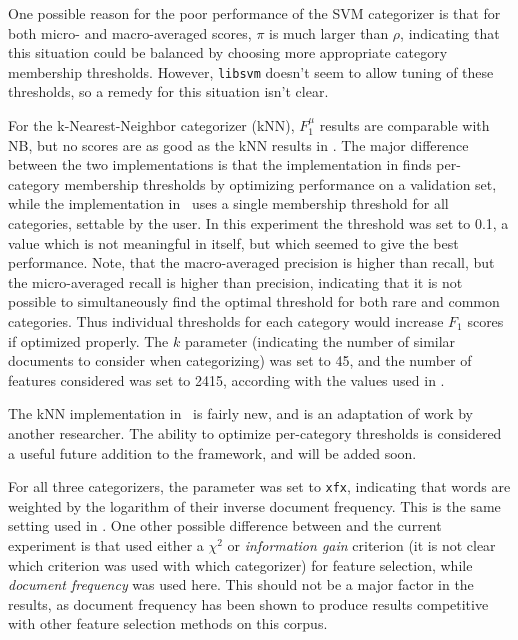 One possible reason for the poor performance of the SVM categorizer is
that for both micro- and macro-averaged scores, $\pi$ is much larger
than $\rho$, indicating that this situation could be balanced by
choosing more appropriate category membership thresholds.  However,
\texttt{libsvm} doesn't seem to allow tuning of these thresholds, so a
remedy for this situation isn't clear.

For the k-Nearest-Neighbor categorizer (kNN), $F_1^\mu$ results are comparable
with NB, but no scores are as good as the kNN results in \cite{yang:99}.
The major difference between the two implementations is that the
implementation in \cite{yang:99} finds per-category membership
thresholds by optimizing performance on a validation set, while the
implementation in \aicat\ uses a single membership threshold for all
categories, settable by the user.  In this experiment the threshold
was set to 0.1, a value which is not meaningful in itself, but which
seemed to give the best performance.  Note, that the macro-averaged
precision is higher than recall, but the micro-averaged recall is
higher than precision, indicating that it is not possible to
simultaneously find the optimal threshold for both rare and common
categories.  Thus individual thresholds for each category would
increase $F_1$ scores if optimized properly.  The $k$ parameter
(indicating the number of similar documents to consider when
categorizing) was set to 45, and the number of features considered was
set to 2415, according with the values used in \cite{yang:99}.

The kNN implementation in \aicat\ is fairly new, and is an adaptation
of work by another researcher.  The ability to optimize per-category
thresholds is considered a useful future addition to the framework,
and will be added soon.

For all three categorizers, the  parameter was set to
\texttt{xfx}, indicating that words are weighted by the logarithm of
their inverse document frequency.  This is the same setting used in
\cite{yang:99}.  One other possible difference between \cite{yang:99}
and the current experiment is that \cite{yang:99} used either a
$\chi^2$ or \emph{information gain} criterion (it is not clear which
criterion was used with which categorizer) for feature selection,
while \emph{document frequency} was used here.  This should not be a
major factor in the results, as document frequency has been shown to
produce results competitive with other feature selection methods on
this corpus. \cite{yang:97}



